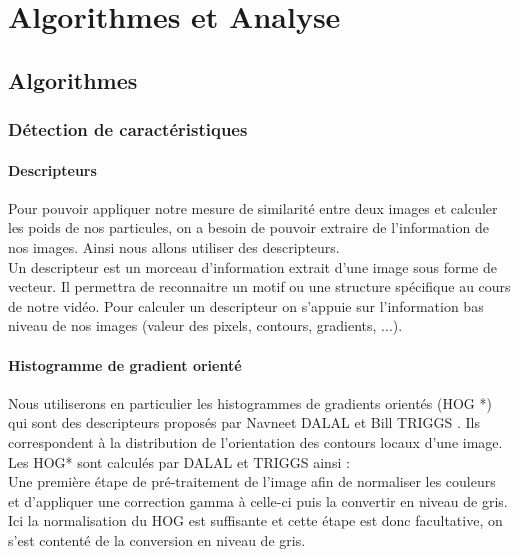 \chapter{Algorithmes et Analyse}

\section{Algorithmes}

\subsection{Détection de caractéristiques}

\subsubsection{Descripteurs}

Pour pouvoir appliquer notre mesure de similarité entre deux images et calculer les poids de nos particules, on a besoin de pouvoir extraire de l'information de nos images. Ainsi nous allons utiliser des descripteurs. \\
Un descripteur est un morceau d'information extrait d'une image sous forme de vecteur. Il permettra de reconnaitre un motif ou une structure spécifique au cours de notre vidéo. Pour calculer un descripteur on s'appuie sur l'information bas niveau de nos images (valeur des pixels, contours, gradients, ...).

\subsubsection{Histogramme de gradient orienté}

Nous utiliserons en particulier les histogrammes de gradients orientés (HOG *) qui sont des descripteurs proposés par Navneet DALAL et Bill TRIGGS \cite{dalal_histograms_2005}. Ils correspondent à la distribution de l'orientation des contours locaux d'une image. \\

Les HOG* sont calculés par DALAL et TRIGGS ainsi : \\

Une première étape de pré-traitement de l'image afin de normaliser les couleurs et d'appliquer une correction gamma à celle-ci puis la convertir en niveau de gris. Ici la normalisation du HOG est suffisante et cette étape est donc facultative, on s'est contenté de la conversion en niveau de gris. \\

